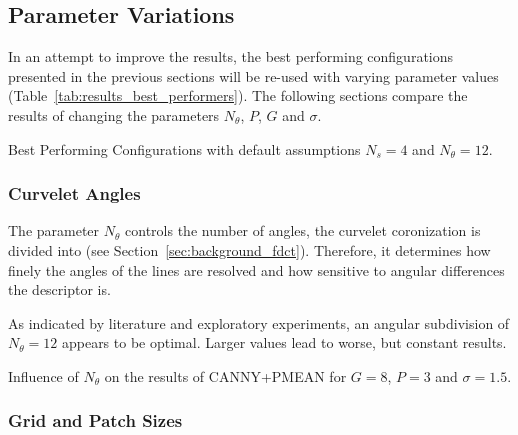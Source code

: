 \subsection{Parameter Variations}\label{sec:results_parameters}

In an attempt to improve the results, the best performing configurations
presented in the previous sections will be re-used with varying parameter
values (Table~\ref{tab:results_best_performers}). The following sections
compare the results of changing the parameters $N_{\theta}$, $P$, $G$ and
$\sigma$.

\begin{table}[h]
    \centering
    \resultsbestperformers
    \caption[Best Performing Configurations]{
        Best Performing Configurations with default assumptions $N_s=4$ and
        $N_{\theta}=12$.
    }
    \label{tab:results_best_performers}
\end{table}

\FloatBarrier
\subsubsection{Curvelet Angles}

The parameter $N_{\theta}$ controls the number of angles, the curvelet
coronization is divided into (see Section~\ref{sec:background_fdct}).
Therefore, it determines how finely the angles of the lines are resolved and
how sensitive to angular differences the descriptor is.

As indicated by literature and exploratory experiments, an angular subdivision
of $N_{\theta} = 12$ appears to be optimal. Larger values lead to worse, but
constant results.

\begin{table}[h]
    \centering
    \resultsparameterangles
    \caption[Angle Parameter Results]{
        Influence of $N_{\theta}$ on the results of CANNY+PMEAN for $G=8$,
        $P=3$ and $\sigma=1.5$.
    }
    \label{tab:results_parameter_angles}
\end{table}

\FloatBarrier
\subsubsection{Grid and Patch Sizes}

